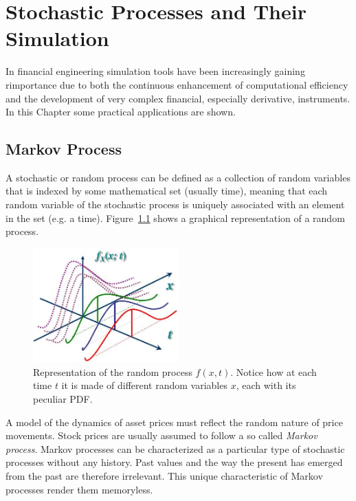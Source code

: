 \chapter{Stochastic Processes and Their Simulation}

In financial engineering simulation tools have been increasingly gaining rimportance due to both the continuous enhancement of computational efficiency and the development of very complex financial, especially derivative, instruments. In this Chapter some practical applications are shown.

\section{Markov Process}

A stochastic or random process can be defined as a collection of random variables that is indexed by some mathematical set (usually time), meaning that each random variable of the stochastic process is uniquely associated with an element in the set (e.g. a time). Figure~\ref{fig:random_process} shows a graphical representation of a random process.

\begin{figure}[htb]
	\centering
	\includegraphics[width=0.5\textwidth]{figures/random_process}
	\caption{Representation of the random process $f(x, t)$. Notice how at each time $t$ it is made of different random variables $x$, each with its peculiar PDF.}
	\label{fig:random_process}
\end{figure}

A model of the dynamics of asset prices must reflect the random nature of price movements. Stock prices are usually assumed to follow a so called \emph{Markov process}. Markov processes can be characterized as a particular type of stochastic processes without any history. Past values and the way the present has emerged from the past are therefore irrelevant. This unique characteristic of Markov processes render them memoryless.

